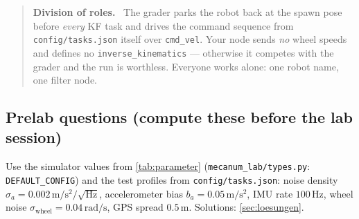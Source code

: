 \documentclass[12pt,a4paper]{scrartcl}
\newcommand{\thema}[1]{\texttt{#1}}
\newcommand{\ordner}[1]{\texttt{#1}}
\begin{document}
\begin{quote}\small
\textbf{Division of roles.}\ \newline
The grader parks the robot back at the spawn pose before \emph{every} KF task and drives
the command sequence from \ordner{config/tasks.json} itself over \thema{cmd\_vel}.
Your node sends \emph{no} wheel speeds and defines no
\thema{inverse\_kinematics} — otherwise it competes with the grader and the run is
worthless. Everyone works alone: one robot name, one filter node.
\end{quote}

\subsection{Prelab questions (compute these before the lab session)}
Use the simulator values from \cref{tab:parameter}
(\ordner{mecanum\_lab/types.py}: \texttt{DEFAULT\_CONFIG}) and the test profiles from
\ordner{config/tasks.json}: noise density \(\sigma_a=0.002\,\mathrm{m/s^2/\sqrt{Hz}}\),
accelerometer bias \(b_a=0.05\,\mathrm{m/s^2}\), IMU rate \(100\,\mathrm{Hz}\),
wheel noise \(\sigma_\text{wheel}=0.04\,\mathrm{rad/s}\), GPS spread
\(0.5\,\mathrm{m}\). Solutions: \cref{sec:loesungen}.
\end{document}
